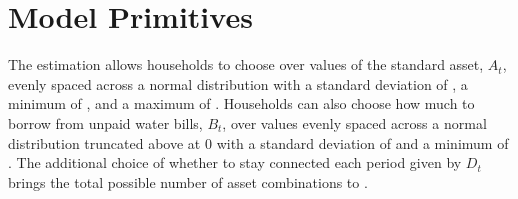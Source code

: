 \documentclass[12pt]{article}
\begin{document}















\section{Model Primitives}    %


The estimation allows households to choose over values of the standard asset, $A_t$, evenly spaced across a normal distribution with a standard deviation of \unskip, a minimum of \unskip, and a maximum of \unskip.  Households can also choose how much to borrow from unpaid water bills, $B_t$, over values evenly spaced across a normal distribution truncated above at 0 with a standard deviation of  and a minimum of \unskip.  The additional choice of whether to stay connected each period given by $D_t$ brings the total possible number of asset combinations to \unskip.
\end{document}
